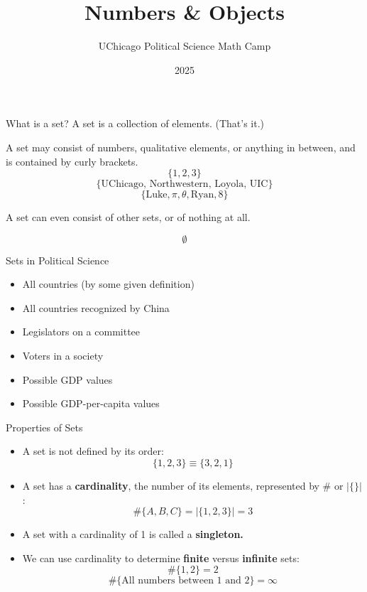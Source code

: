 \documentclass[10pt]{beamer}
\title{Numbers \& Objects}
\author{UChicago Political Science Math Camp}
\institute{Ryan Gibbons \& Luke Cain}
\date{2025}
\begin{document}
\frame{\titlepage}

\begin{frame}{What is a set?}
    A set is a collection of elements. (That's it.)
\pause

    A set may consist of numbers, qualitative elements, or anything in between, and is contained by curly brackets. \\

    \[\{1,2,3\}\]
    \[\{\text{UChicago, Northwestern, Loyola, UIC}\}\]
    \[\{\text{Luke}, \pi, \theta, \text{Ryan}, 8\}\]
\pause

    A set can even consist of other sets, or of nothing at all.

    \[\emptyset\]

\end{frame}

\begin{frame}{Sets in Political Science}
    \begin{itemize}
        \item All countries (by some given definition)
        \item All countries recognized by China
        \item Legislators on a committee
        \item Voters in a society
        \item Possible GDP values
        \item Possible GDP-per-capita values
    \end{itemize}
\end{frame}

\begin{frame}{Properties of Sets}
    \begin{itemize}
        \item A set is not defined by its order:
        \[\{1,2,3\} \equiv \{3,2,1\}\]

        \pause
        \item A set has a \textbf{cardinality}, the number of its elements, represented by $\#$ or $|\{ \}|$:
        \[\#\{A,B,C\} = |\{1,2,3\}| =  3\]
        \pause

        \item A set with a cardinality of 1 is called a \textbf{singleton.}
        \pause

        \item We can use cardinality to determine \textbf{finite} versus \textbf{infinite} sets:
        \[\#\{1,2\} = 2\]
        \[\#\{\text{All numbers between 1 and 2}\} = \infty\]
    \end{itemize}
\end{frame}
\end{document}
